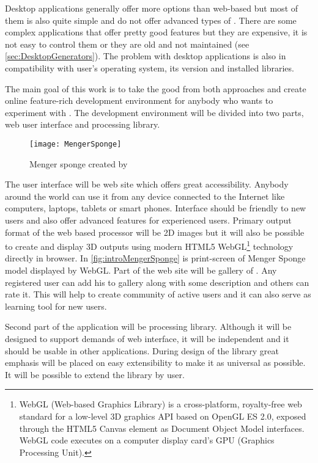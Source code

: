 Desktop applications generally offer more options than web-based but most of them is also quite simple and do not offer advanced types of \lsystems.
There are some complex applications that offer pretty good features but they are expensive, it is not easy to control them or they are old and not maintained (see \autoref{sec:DesktopGenerators}).
The problem with desktop applications is also in compatibility with user's operating system, its version and installed libraries.

The main goal of this work is to take the good from both approaches and create online feature-rich development environment for anybody who wants to experiment with \lsystems.
The development environment will be divided into two parts, web user interface and \lsystem processing library.

\begin{wrapfigure}{r}{0.5\textwidth}%
	\vspace{6pt}%
	\texttt{[image: MengerSponge]}
	\caption{Menger sponge created by \lsystem}
	\label{fig:introMengerSponge}
\end{wrapfigure}

The user interface will be web site which offers great accessibility.
Anybody around the world can use it from any device connected to the Internet like computers, laptops, tablets or smart phones.
Interface should be friendly to new users and also offer advanced features for experienced users.
Primary output format of the web based \lsystem processor will be 2D images but it will also be possible to create and display 3D outputs using modern HTML5 WebGL\footnote{
	WebGL (Web-based Graphics Library) is a cross-platform, royalty-free web standard for a low-level 3D graphics API based on OpenGL ES 2.0, exposed through the HTML5 Canvas element as Document Object Model interfaces.
	WebGL code executes on a computer display card's GPU (Graphics Processing Unit).} technology directly in browser.
In \autoref{fig:introMengerSponge} is print-screen of Menger Sponge model displayed by WebGL.
Part of the web site will be gallery of \lsystems.
Any registered user can add his \lsystems to gallery along with some description and others can rate it.
This will help to create community of active users and it can also serve as learning tool for new users.

Second part of the application will be \lsystem processing library.
Although it will be designed to support demands of web interface, it will be independent and it should be usable in other applications.
During design of the library great emphasis will be placed on easy extensibility to make it as universal as possible.
It will be possible to extend the library by user.

